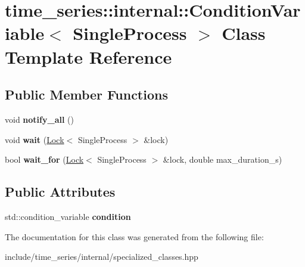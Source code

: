\hypertarget{classtime__series_1_1internal_1_1ConditionVariable_3_01SingleProcess_01_4}{}\section{time\+\_\+series\+:\+:internal\+:\+:Condition\+Variable$<$ Single\+Process $>$ Class Template Reference}
\label{classtime__series_1_1internal_1_1ConditionVariable_3_01SingleProcess_01_4}
\subsection*{Public Member Functions}
\begin{DoxyCompactItemize}
\item 
\mbox{\label{classtime__series_1_1internal_1_1ConditionVariable_3_01SingleProcess_01_4_a867255ac9bea0a76ad142e5cf9a3a882}} 
void {\bfseries notify\+\_\+all} ()
\item 
\mbox{\label{classtime__series_1_1internal_1_1ConditionVariable_3_01SingleProcess_01_4_a3eb5fc902d9f663da83a904a4f87c1bb}} 
void {\bfseries wait} (\hyperlink{classtime__series_1_1internal_1_1Lock}{Lock}$<$ Single\+Process $>$ \&lock)
\item 
\mbox{\label{classtime__series_1_1internal_1_1ConditionVariable_3_01SingleProcess_01_4_a7a059a332c5ec04291aecdaac4a95292}} 
bool {\bfseries wait\+\_\+for} (\hyperlink{classtime__series_1_1internal_1_1Lock}{Lock}$<$ Single\+Process $>$ \&lock, double max\+\_\+duration\+\_\+s)
\end{DoxyCompactItemize}
\subsection*{Public Attributes}
\begin{DoxyCompactItemize}
\item 
\mbox{\label{classtime__series_1_1internal_1_1ConditionVariable_3_01SingleProcess_01_4_a32e166e9ba3db5d95730b87211748ecf}} 
std\+::condition\+\_\+variable {\bfseries condition}
\end{DoxyCompactItemize}


The documentation for this class was generated from the following file\+:\begin{DoxyCompactItemize}
\item 
include/time\+\_\+series/internal/specialized\+\_\+classes.\+hpp\end{DoxyCompactItemize}
